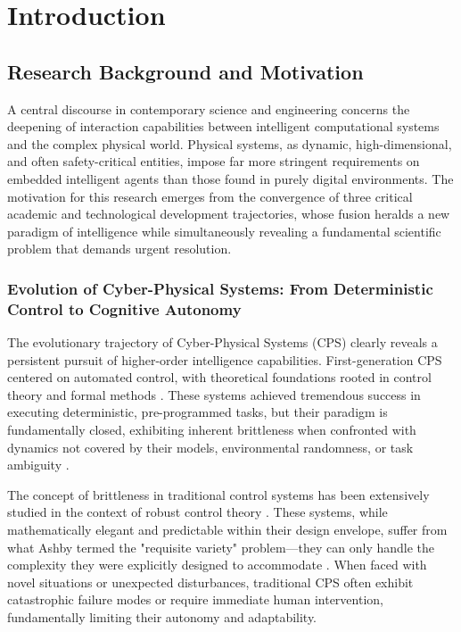
\chapter{Introduction} \label{chp:intro}

\section{Research Background and Motivation}

A central discourse in contemporary science and engineering concerns the deepening of interaction capabilities between intelligent computational systems and the complex physical world. Physical systems, as dynamic, high-dimensional, and often safety-critical entities, impose far more stringent requirements on embedded intelligent agents than those found in purely digital environments. The motivation for this research emerges from the convergence of three critical academic and technological development trajectories, whose fusion heralds a new paradigm of intelligence while simultaneously revealing a fundamental scientific problem that demands urgent resolution.

\subsection{Evolution of Cyber-Physical Systems: From Deterministic Control to Cognitive Autonomy}

The evolutionary trajectory of Cyber-Physical Systems (CPS) clearly reveals a persistent pursuit of higher-order intelligence capabilities. First-generation CPS centered on automated control, with theoretical foundations rooted in control theory and formal methods \cite{lee2008cyber, rajkumar2010cyber}. These systems achieved tremendous success in executing deterministic, pre-programmed tasks, but their paradigm is fundamentally closed, exhibiting inherent brittleness when confronted with dynamics not covered by their models, environmental randomness, or task ambiguity \cite{baheti2011cyber, kim2012cyber}.

The concept of brittleness in traditional control systems has been extensively studied in the context of robust control theory \cite{doyle1989robust, zhou1996robust}. These systems, while mathematically elegant and predictable within their design envelope, suffer from what Ashby termed the "requisite variety" problem—they can only handle the complexity they were explicitly designed to accommodate \cite{ashby1956introduction}. When faced with novel situations or unexpected disturbances, traditional CPS often exhibit catastrophic failure modes or require immediate human intervention, fundamentally limiting their autonomy and adaptability.

